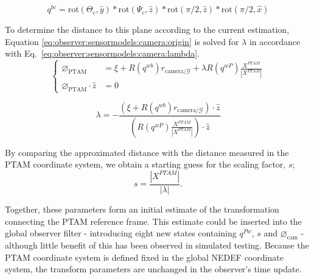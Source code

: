         \begin{equation}
        \label{eq:observer:sensormodels:qbc}
            q^{bc} = \text{rot}(\Theta_{c}, \hat{y}) * \text{rot}(\Psi_{c}, \hat{z}) * \text{rot}(\pi/2, \hat{z}) * \text{rot}(\pi/2, \hat{x})
        \end{equation}

        To determine the distance to this plane according to the current estimation,
        Equation \eqref{eq:observer:sensormodels:camera:origin} is solved for $\lambda$
        in accordance with Eq.~\ref{eq:observer:sensormodels:camera:lambda}.
        \begin{equation}
            \label{eq:observer:sensormodels:camera:origin}
            \left\lbrace
            \begin{array}{ll}
                \varnothing_{\text{PTAM}} &= \xi + R(q^{wb}) r_{\text{camera}/\mathcal{G}} + \lambda R(q^{wP}) \frac{X^{PTAM}}{|X^{PTAM}|} \\
                \varnothing_{\text{PTAM}} \cdot \hat{z} &= 0
            \end{array}\right.
        \end{equation}

        \begin{equation}
            \label{eq:observer:sensormodels:camera:lambda}
            \lambda = -\frac{\left(\xi + R(q^{wb}) r_{\text{camera}/\mathcal{G}} \right) \cdot \hat{z}}{\left( R(q^{wP}) \frac{X^{PTAM}}{|X^{PTAM}|} \right) \cdot \hat{z}}
        \end{equation}


        By comparing the approximated distance with the distance measured
        in the PTAM coordinate system, we obtain a starting guess for the scaling factor, $s$;
        \begin{equation}
            s = \frac{|X^{PTAM}|}{|\lambda|}.
        \end{equation}

        Together, these parameters form an initial estimate of the transformation
        connecting the PTAM reference frame. This estimate could be inserted into
        the global observer filter - introducing eight new states containing
        $q^{Pw}$, $s$ and $\varnothing_{\text{cam}}$ - although little benefit
        of this has been observed in simulated testing.
        Because the PTAM coordinate system is defined fixed in the global NEDEF coordinate system,
        the transform parameters are unchanged in the observer's time update.

